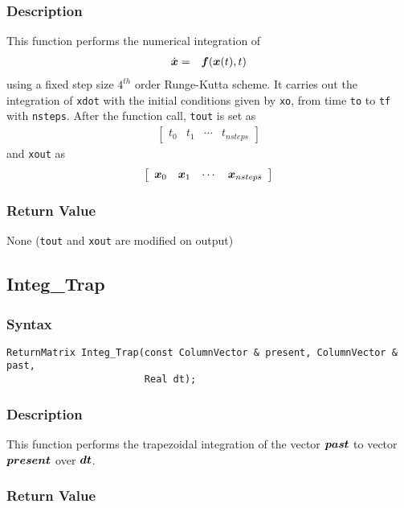 \documentclass[11pt,fleqn,letterpaper]{report}
\newcommand{\mbold}[1]{\mbox{\boldmath $ #1 $}}
\newcommand{\matr}[2]{\left[\begin{array}{#1} #2 \end{array}\right]}
\begin{document}
\subsubsection*{Description}
This function performs the numerical integration of 
\begin{eqnarray}
\dot{\mbold{x}} & = & \mbold{f}(\mbold{x}(t),t)
\end{eqnarray}
using a fixed step size $4^{th}$ order Runge-Kutta scheme.  It carries
out the integration of {\tt xdot} with the initial conditions given by
{\tt xo}, from time {\tt to} to {\tt tf} with {\tt nsteps}. After the
function call, {\tt tout} is set as
\begin{eqnarray}
\matr{cccc}{ t_0 & t_1 & \cdots & t_{nsteps}}
\end{eqnarray}
and {\tt xout} as
\begin{eqnarray}
\matr{cccc}{ \mbold{x}_0 & \mbold{x}_1 & \cdots & \mbold{x}_{nsteps}}
\end{eqnarray}



\subsubsection*{Return Value}

None ({\tt tout} and {\tt xout} are modified on output)

\newpage

\subsection*{Integ\_Trap}
\subsubsection*{Syntax}
\begin{verbatim}
ReturnMatrix Integ_Trap(const ColumnVector & present, ColumnVector & past, 
                        Real dt);
\end{verbatim}
\subsubsection*{Description}
This function performs the trapezoidal integration of the vector
$\mbold{past}$ to vector $\mbold{present}$ over $\mbold{dt}$.


\subsubsection*{Return Value}
\end{document}
